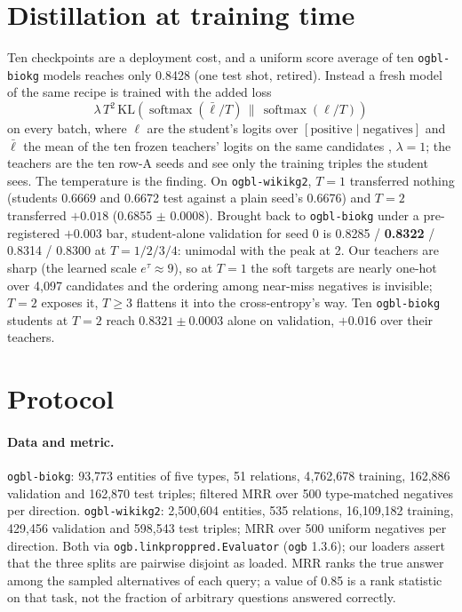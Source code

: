 \documentclass[11pt,a4paper]{article}
\begin{document}
\section{Distillation at training time}
\label{sec:distill}

Ten checkpoints are a deployment cost, and a uniform score average of ten
\texttt{ogbl-biokg} models reaches only 0.8428 (one test shot, retired).
Instead a fresh model of the same recipe is trained with the added loss
\begin{equation}
  \lambda\,T^2\,\mathrm{KL}\!\left(\operatorname{softmax}(\bar\ell/T)\,\big\|\,
  \operatorname{softmax}(\ell/T)\right)
\end{equation}
on every batch, where $\ell$ are the student's logits over
$[\text{positive}\mid\text{negatives}]$ and $\bar\ell$ the mean of the
ten frozen teachers' logits on the same candidates
\citep{hinton2015distilling}, $\lambda=1$; the teachers are the ten
row-A seeds and see only the training triples the student sees. The
temperature is the finding. On \texttt{ogbl-wikikg2}, $T=1$ transferred
nothing (students 0.6669 and 0.6672 test against a plain seed's 0.6676)
and $T=2$ transferred $+0.018$ (0.6855 $\pm$ 0.0008). Brought back to
\texttt{ogbl-biokg} under a pre-registered $+0.003$ bar, student-alone
validation for seed 0 is 0.8285 / \textbf{0.8322} / 0.8314 / 0.8300 at
$T=1/2/3/4$: unimodal with the peak at 2. Our teachers are sharp (the
learned scale $e^\tau\approx9$), so at $T=1$ the soft targets are nearly
one-hot over 4{,}097 candidates and the ordering among near-miss
negatives is invisible; $T=2$ exposes it, $T\ge3$ flattens it into the
cross-entropy's way. Ten \texttt{ogbl-biokg} students at $T=2$ reach
$0.8321\pm0.0003$ alone on validation, $+0.016$ over their teachers.

\section{Protocol}
\label{sec:protocol}

\paragraph{Data and metric.}
\texttt{ogbl-biokg}: 93{,}773 entities of five types, 51 relations,
4{,}762{,}678 training, 162{,}886 validation and 162{,}870 test triples;
filtered MRR over 500 type-matched negatives per direction.
\texttt{ogbl-wikikg2}: 2{,}500{,}604 entities, 535 relations, 16{,}109{,}182
training, 429{,}456 validation and 598{,}543 test triples; MRR over 500
uniform negatives per direction. Both via
\texttt{ogb.linkproppred.Evaluator} (\texttt{ogb} 1.3.6); our loaders
assert that the three splits are pairwise disjoint as loaded. MRR ranks
the true answer among the sampled alternatives of each query; a value of
0.85 is a rank statistic on that task, not the fraction of arbitrary
questions answered correctly.
\end{document}
